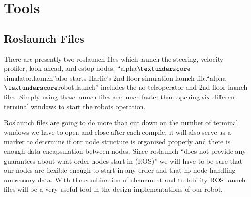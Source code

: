 \documentclass{article}
\begin{document}
\section{Tools}
\subsection{Roslaunch Files}
There are presently two roslaunch files which launch the steering, velocity profiler, look ahead, and estop nodes. ``alpha$\textunderscore$simulator.launch''also starts Harlie's 2nd floor simulation launch file.``alpha$\textunderscore$robot.launch'' includes the no teleoperator and 2nd floor launch files. Simply using these launch files are much faster than opening six different terminal windows to start the robots operation.

Roslaunch files are going to do more than cut down on the number of terminal windows we have to open and close after each compile, it will also serve as a marker to determine if our node structure is organized properly and there is enough data encapsulation between nodes. Since roslaunch ``does not provide any guarantees about what order nodes start in (ROS)'' we will have to be sure that our nodes are flexible enough to start in any order and that no node handling unecessary data. With the combination of ehancment and testability ROS launch files will be a very useful tool in the design implementations of our robot.
\end{document}
